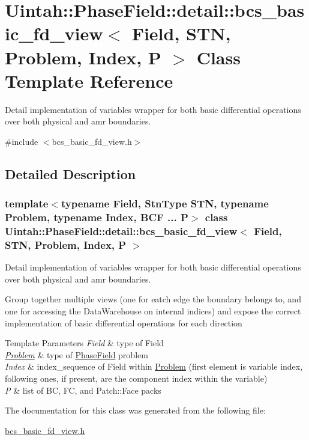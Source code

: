 \hypertarget{classUintah_1_1PhaseField_1_1detail_1_1bcs__basic__fd__view}{}\section{Uintah\+:\+:Phase\+Field\+:\+:detail\+:\+:bcs\+\_\+basic\+\_\+fd\+\_\+view$<$ Field, S\+TN, Problem, Index, P $>$ Class Template Reference}
\label{classUintah_1_1PhaseField_1_1detail_1_1bcs__basic__fd__view}


Detail implementation of variables wrapper for both basic differential operations over both physical and amr boundaries.  




{\ttfamily \#include $<$bcs\+\_\+basic\+\_\+fd\+\_\+view.\+h$>$}



\subsection{Detailed Description}
\subsubsection*{template$<$typename Field, Stn\+Type S\+TN, typename Problem, typename Index, B\+C\+F ... P$>$\newline
class Uintah\+::\+Phase\+Field\+::detail\+::bcs\+\_\+basic\+\_\+fd\+\_\+view$<$ Field, S\+T\+N, Problem, Index, P $>$}

Detail implementation of variables wrapper for both basic differential operations over both physical and amr boundaries. 

Group together multiple views (one for eatch edge the boundary belongs to, and one for accessing the Data\+Warehouse on internal indices) and expose the correct implementation of basic differential operations for each direction


\begin{DoxyTemplParams}{Template Parameters}
{\em Field} & type of Field \\
\hline
{\em \hyperlink{classUintah_1_1PhaseField_1_1Problem}{Problem}} & type of \hyperlink{namespaceUintah_1_1PhaseField}{Phase\+Field} problem \\
\hline
{\em Index} & index\+\_\+sequence of Field within \hyperlink{classUintah_1_1PhaseField_1_1Problem}{Problem} (first element is variable index, following ones, if present, are the component index within the variable) \\
\hline
{\em P} & list of BC, FC, and Patch\+::\+Face packs \\
\hline
\end{DoxyTemplParams}


The documentation for this class was generated from the following file\+:\begin{DoxyCompactItemize}
\item 
\hyperlink{bcs__basic__fd__view_8h}{bcs\+\_\+basic\+\_\+fd\+\_\+view.\+h}\end{DoxyCompactItemize}
